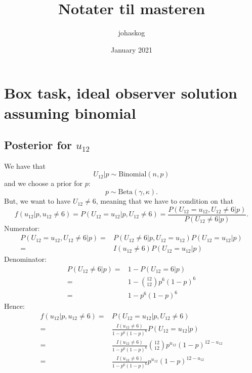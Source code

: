 \documentclass{article}
\title{Notater til masteren}
\author{johaskog }
\date{January 2021}
\begin{document}
\maketitle

\section{Box task, ideal observer solution assuming binomial}
\subsection{Posterior for $u_{12}$}
We have that 
\begin{equation*}
    U_{12}|p \sim \text{Binomial}(n,p)
\end{equation*}
and we choose a prior for $p$:
\begin{equation*}
    p \sim \text{Beta}(\gamma,\kappa).
\end{equation*}
But, we want to have $U_{12}\neq 6$, meaning that we have to condition on that
\begin{equation*}
    f(u_{12}|p,u_{12}\neq6) = P(U_{12}=u_{12}|p,U_{12}\neq6) = \frac{P(U_{12}=u_{12},U_{12}\neq6|p)}{P(U_{12}\neq6|p)}.
\end{equation*}
Numerator:
\begin{equation*}
    \begin{aligned}
        P(U_{12}=u_{12},U_{12}\neq6|p) 
        = &P(U_{12}\neq6|p,U_{12}=u_{12})P(U_{12}=u_{12}|p)\\
        = &I(u_{12}\neq6)P(U_{12}=u_{12}|p)
    \end{aligned}
\end{equation*}
Denominator:
\begin{equation*}
    \begin{aligned}
        P(U_{12}\neq6|p)
        = &1-P(U_{12}=6|p)\\
        = &1-\binom{12}{12}p^6(1-p)^6\\
        = & 1-p^6(1-p)^6
    \end{aligned}
\end{equation*}
Hence:
\begin{equation*}
    \begin{aligned}
        f(u_{12}|p,u_{12}\neq6)
        = &P(U_{12}=u_{12}|p,U_{12}\neq6)\\
        = &\frac{I(u_{12}\neq6)}{1-p^6(1-p)^6}P(U_{12}=u_12|p) \\
        = &\frac{I(u_{12}\neq6)}{1-p^6(1-p)^6}\binom{12}{12}p^{u_{12}}(1-p)^{12-u_{12}}\\
        = &\frac{I(u_{12}\neq6)}{1-p^6(1-p)^6}p^{u_{12}}(1-p)^{12-u_{12}}
    \end{aligned}
\end{equation*}
\end{document}

